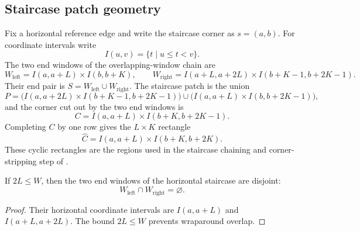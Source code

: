 \subsection{Staircase patch geometry}
\label{subsec:peps_torus_staircase_patch_geometry}

\begin{definition}
    \label{def:peps_horizontal_staircase_patch}
    \leanok
    Fix a horizontal reference edge and write the staircase corner as
    $s=(a,b)$.  For coordinate intervals write
    \[
        I(u,v)=\{t\mid u\le t<v\}.
    \]
    The two end windows of the overlapping-window chain are
    \[
        W_{\mathrm{left}}=I(a,a+L)\times I(b,b+K),
        \qquad
        W_{\mathrm{right}}
        =I(a+L,a+2L)\times I(b+K-1,b+2K-1).
    \]
    Their end pair is $S=W_{\mathrm{left}}\cup W_{\mathrm{right}}$.  The
    staircase patch is the union
    \[
        P=
        \bigl(I(a,a+2L)\times I(b+K-1,b+2K-1)\bigr)
        \cup
        \bigl(I(a,a+L)\times I(b,b+2K-1)\bigr),
    \]
    and the corner cut out by the two end windows is
    \[
        C=I(a,a+L)\times I(b+K,b+2K-1).
    \]
    Completing $C$ by one row gives the $L\times K$ rectangle
    \[
        \widehat C=I(a,a+L)\times I(b+K,b+2K).
    \]
    These cyclic rectangles are the regions used in the staircase chaining and
    corner-stripping step of
    \cite[proof sketch, lines~2320--2445]{Molnar2018NormalPEPS}.
\end{definition}

\begin{lemma}
    \label{lem:peps_horizontal_staircase_end_pair_disjoint}
    \leanok
    If $2L\le W$, then the two end windows of the horizontal staircase are
    disjoint:
    \[
        W_{\mathrm{left}}\cap W_{\mathrm{right}}=\varnothing.
    \]
\end{lemma}
\begin{proof}
    \leanok
    Their horizontal coordinate intervals are $I(a,a+L)$ and $I(a+L,a+2L)$.
    The bound $2L\le W$ prevents wraparound overlap.
\end{proof}

